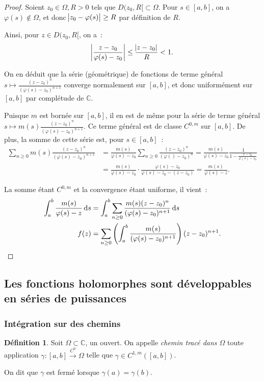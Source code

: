 \documentclass{report}
\theoremstyle{definition}
\newtheorem{déf}[thm]{Définition}
\theoremstyle{remark}
\numberwithin{equation}{section}
\newcommand{\C}{\mathbb C}
\newcommand{\toC}[1]{\xrightarrow{C^{#1}}}
\newcommand{\tocont}{\toC 0}
\begin{document}
			\begin{proof} Soient $z_0 \in \Omega, R > 0$ tels que $D(z_0, R[ \subset \Omega$. Pour $s \in [a, b]$, on a $\varphi(s) \not \in \Omega$, et donc
			$\abs {z_0-\varphi(s)} \geq R$ par définition de $R$.

			Ainsi, pour $z \in D(z_0, R[$, on a~:
			\begin{equation}
				\abs {\frac {z-z_0}{\varphi(s)-z_0}} \leq \frac {\abs {z-z_0}}R < 1.
			\end{equation}

			On en déduit que la série (géométrique) de fonctions de terme général $s \mapsto \frac {(z-z_0)^n}{(\varphi(s) - z_0)^{n+1}}$ converge normalement
			sur $[a, b]$, et donc uniformément sur $[a, b]$ par complétude de $\C$.

			Puisque $m$ est bornée sur $[a, b]$, il en est de même pour la série de terme général $s \mapsto m(s)\frac {(z-z_0)^n}{(\varphi(s) - z_0)^{n+1}}$.
			Ce terme général est de classe $C^{0, m}$ sur $[a, b]$. De plus, la somme de cette série est, pour $s \in [a, b]$~:
			\begin{align}
				\sum_{n \geq 0}m(s)\frac {(z-z_0)^n}{(\varphi(s)-z_0)^{n+1}} &= \frac {m(s)}{\varphi(s)-z_0}\sum_{n \geq 0}\frac {(z-z_0)^n}{(\varphi()-z_0)^n}
					= \frac {m(s)}{\varphi(s)-z_0}\frac 1{1-\frac {z-z_0}{\varphi(s)-z_0}} \\
				&= \frac {m(s)}{\varphi(s)-z_0} \cdot \frac {\varphi(s)-z_0}{\varphi(s) - z_0 - (z-z_0)} = \frac {m(s)}{\varphi(s)-z}.
			\end{align}

			La somme étant $C^{0,m}$ et la convergence étant uniforme, il vient~:
			\begin{align}
				\int_a^b\frac {m(s)}{\varphi(s)-z}\dif s &= \int_a^b\sum_{n \geq 0}\frac {m(s)(z-z_0)^n}{(\varphi(s) - z_0)^{n+1}}\dif s \\
				f(z) &= \sum_{n \geq 0}\left(\int_a^b\frac {m(s)}{(\varphi(s)-z_0)^{n+1}}\right)(z-z_0)^{n+1}.
			\end{align}
			\end{proof}

	\subsection{Les fonctions holomorphes sont développables en séries de puissances}
		\subsubsection{Intégration sur des chemins}
			\begin{déf} Soit $\Omega \subset \C$, un ouvert. On appelle \textit{chemin tracé dans $\Omega$} toute application $\gamma : [a, b] \tocont \Omega$
			telle que $\gamma \in C^{1,m}([a, b])$.

			On dit que $\gamma$ est fermé lorsque $\gamma(a) = \gamma(b)$.
			\end{déf}
\end{document}
